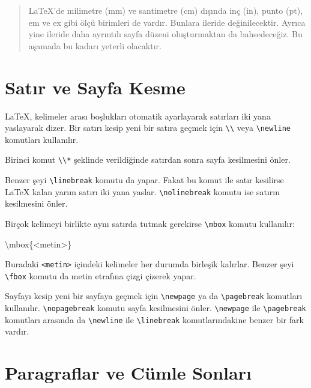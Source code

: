 \documentclass[
  10pt,
]{scrbook}
\newenvironment{Shaded}{}{}
\newcommand{\FunctionTok}[1]{\textcolor[rgb]{0.02,0.16,0.49}{#1}}
\newcommand{\NormalTok}[1]{#1}
\theoremstyle{definition}
\theoremstyle{definition}
\theoremstyle{definition}
\theoremstyle{definition}
\theoremstyle{remark}
\begin{document}
\begin{quote}
LaTeX'de milimetre (mm) ve santimetre (cm) dışında inç (in), punto (pt), em ve ex gibi ölçü birimleri de vardır. Bunlara ileride değinilecektir. Ayrıca yine ileride daha ayrıntılı sayfa düzeni oluşturmaktan da bahsedeceğiz. Bu aşamada bu kadarı yeterli olacaktır.
\end{quote}

\hypertarget{satux131r-ve-sayfa-kesme}{%
\section{Satır ve Sayfa Kesme}\label{satux131r-ve-sayfa-kesme}}

LaTeX, kelimeler arası boşlukları otomatik ayarlayarak satırları iki yana yaslayarak dizer. Bir satırı kesip yeni bir satıra geçmek için \texttt{\textbackslash{}\textbackslash{}} veya \texttt{\textbackslash{}newline} komutları kullanılır.

Birinci komut \texttt{\textbackslash{}\textbackslash{}*} şeklinde verildiğinde satırdan sonra sayfa kesilmesini önler.

Benzer şeyi \texttt{\textbackslash{}linebreak} komutu da yapar. Fakat bu komut ile satır kesilirse LaTeX kalan yarım satırı iki yana yaslar. \texttt{\textbackslash{}nolinebreak} komutu ise satırın kesilmesini önler.

Birçok kelimeyi birlikte aynı satırda tutmak gerekirse \texttt{\textbackslash{}mbox} komutu kullanılır:

\begin{Shaded}
\begin{Highlighting}[]
\FunctionTok{\textbackslash{}mbox}\NormalTok{\{\textless{}metin\textgreater{}\}}
\end{Highlighting}
\end{Shaded}

Buradaki \texttt{\textless{}metin\textgreater{}} içindeki kelimeler her durumda birleşik kalırlar. Benzer şeyi \texttt{\textbackslash{}fbox} komutu da metin etrafına çizgi çizerek yapar.

Sayfayı kesip yeni bir sayfaya geçmek için \texttt{\textbackslash{}newpage} ya da \texttt{\textbackslash{}pagebreak} komutları kullanılır. \texttt{\textbackslash{}nopagebreak} komutu sayfa kesilmesini önler. \texttt{\textbackslash{}newpage} ile \texttt{\textbackslash{}pagebreak} komutları arasında da \texttt{\textbackslash{}newline} ile \texttt{\textbackslash{}linebreak} komutlarındakine benzer bir fark vardır.

\hypertarget{paragraflar-ve-cuxfcmle-sonlarux131}{%
\section{Paragraflar ve Cümle Sonları}\label{paragraflar-ve-cuxfcmle-sonlarux131}}
\end{document}
